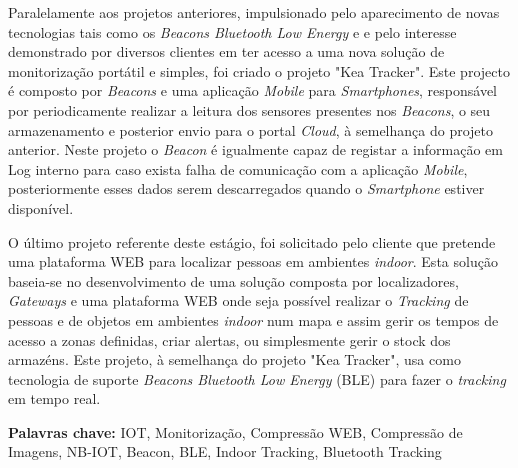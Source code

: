 \par Paralelamente aos projetos anteriores, impulsionado pelo aparecimento de novas tecnologias tais como os \textit{Beacons Bluetooth Low Energy} e e pelo interesse demonstrado por diversos clientes em ter acesso a uma nova solução de monitorização portátil e simples, foi criado o projeto "Kea Tracker". Este projecto é composto por \textit{Beacons} e uma aplicação \textit{Mobile} para \textit{Smartphones}, responsável por periodicamente realizar a leitura dos sensores presentes nos \textit{Beacons}, o seu armazenamento e posterior envio para o portal \textit{Cloud}, à semelhança do projeto anterior. Neste projeto o \textit{Beacon} é igualmente capaz de registar a informação em Log interno para caso exista falha de comunicação com a aplicação \textit{Mobile}, posteriormente esses dados serem descarregados quando o \textit{Smartphone} estiver disponível.

\par O último projeto referente deste estágio, foi solicitado pelo cliente que pretende uma plataforma WEB para localizar pessoas em ambientes \textit{indoor}. Esta solução baseia-se no desenvolvimento de uma solução composta por localizadores, \textit{Gateways} e uma plataforma WEB onde seja possível realizar o \textit{Tracking} de pessoas e de objetos em ambientes \textit{indoor} num mapa e assim gerir os tempos de acesso a zonas definidas, criar alertas, ou simplesmente gerir o stock dos armazéns. Este projeto, à semelhança do projeto "Kea Tracker", usa como tecnologia de suporte \textit{Beacons Bluetooth Low Energy} (BLE) para fazer o \textit{tracking} em tempo real.




\bigskip

\textbf{Palavras chave:}
IOT, Monitorização, Compressão WEB, Compressão de Imagens, NB-IOT, Beacon, BLE, Indoor Tracking, Bluetooth Tracking
